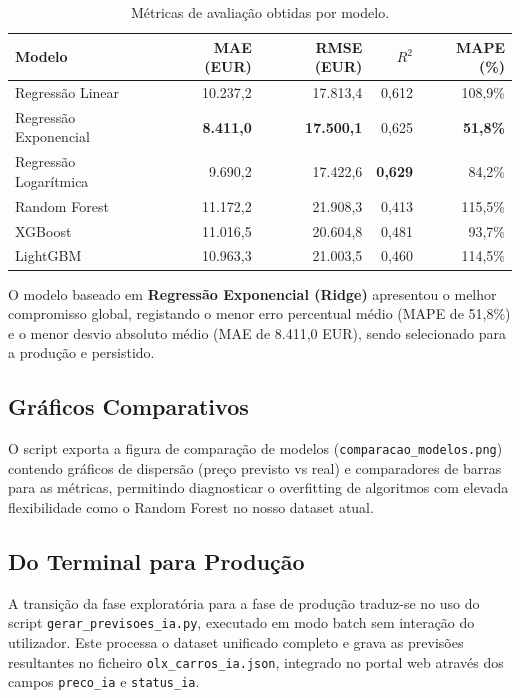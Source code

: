 \documentclass[11pt,a4paper]{article}
\begin{document}
\begin{table}[H]
\centering
\caption{Métricas de avaliação obtidas por modelo.}
\label{tab:metricas_exec}
\begin{tabular}{lrrrr}
\toprule
\textbf{Modelo} & \textbf{MAE (EUR)} & \textbf{RMSE (EUR)} & \textbf{$R^2$} & \textbf{MAPE (\%)} \\
\midrule
Regressão Linear & 10.237,2 & 17.813,4 & 0,612 & 108,9\% \\
Regressão Exponencial & \textbf{8.411,0} & \textbf{17.500,1} & 0,625 & \textbf{51,8\%} \\
Regressão Logarítmica & 9.690,2 & 17.422,6 & \textbf{0,629} & 84,2\% \\
Random Forest & 11.172,2 & 21.908,3 & 0,413 & 115,5\% \\
XGBoost & 11.016,5 & 20.604,8 & 0,481 & 93,7\% \\
LightGBM & 10.963,3 & 21.003,5 & 0,460 & 114,5\% \\
\bottomrule
\end{tabular}
\end{table}

O modelo baseado em \textbf{Regressão Exponencial (Ridge)} apresentou o melhor compromisso global, registando o menor erro percentual médio (MAPE de 51,8\%) e o menor desvio absoluto médio (MAE de 8.411,0 EUR), sendo selecionado para a produção e persistido.

\subsection{Gráficos Comparativos}
O script exporta a figura de comparação de modelos (\texttt{comparacao\_modelos.png}) contendo gráficos de dispersão (preço previsto vs real) e comparadores de barras para as métricas, permitindo diagnosticar o overfitting de algoritmos com elevada flexibilidade como o Random Forest no nosso dataset atual.

\subsection{Do Terminal para Produção}
A transição da fase exploratória para a fase de produção traduz-se no uso do script \texttt{gerar\_previsoes\_ia.py}, executado em modo batch sem interação do utilizador. Este processa o dataset unificado completo e grava as previsões resultantes no ficheiro \texttt{olx\_carros\_ia.json}, integrado no portal web através dos campos \texttt{preco\_ia} e \texttt{status\_ia}.
\end{document}
